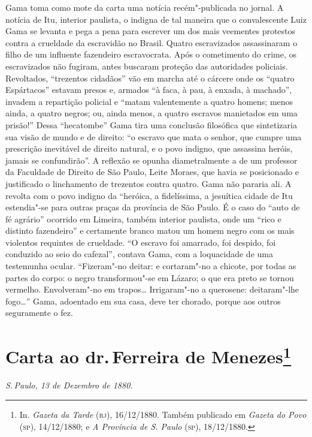 {\small\noindent
Gama toma como mote da carta uma notícia recém"-publicada no
jornal. A notícia de Itu, interior paulista, o indigna de tal
maneira que o convalescente Luiz Gama se levanta e pega a pena para
escrever um dos mais veementes protestos contra a crueldade da
escravidão no Brasil. Quatro escravizados assassinaram o filho de um
influente fazendeiro escravocrata. Após o cometimento do crime, os
escravizados não fugiram, antes buscaram proteção das autoridades
policiais. Revoltados, ``trezentos cidadãos'' vão em marcha até o cárcere
onde os ``quatro Espártacos'' estavam presos e, armados ``à faca, à pau, à
enxada, à machado'', invadem a repartição policial e ``matam valentemente
a quatro homens; menos ainda, a quatro negros; ou, ainda menos, a quatro
escravos manietados em uma prisão!'' Dessa ``hecatombe'' Gama tira uma
conclusão filosófica que sintetizaria sua visão de mundo e de direito:
``o escravo que mata o senhor, que cumpre uma prescrição inevitável de
direito natural, e o povo indigno, que assassina heróis, jamais se
confundirão''. A reflexão se opunha diametralmente a de um professor da
Faculdade de Direito de São Paulo, Leite Moraes, que havia se
posicionado e justificado o linchamento de trezentos contra quatro. Gama
não pararia ali. A revolta com o povo indigno da ``heróica, a
fidelíssima, a jesuítica cidade de Itu estendia"-se para outras praças
da província de São Paulo. É o caso do ``auto de fé agrário'' ocorrido em
Limeira, também interior paulista, onde um ``rico e distinto fazendeiro''
e certamente branco matou um homem negro com os mais violentos requintes de
crueldade. ``O escravo foi amarrado, foi despido, foi conduzido ao
seio do cafezal'', contava Gama, com a loquacidade de uma testemunha
ocular. ``Fizeram"-no deitar: e cortaram"-no a chicote, por todas as partes
do corpo: o negro transformou"-se em Lázaro; o que era preto se tornou
vermelho. Envolveram"-no em trapos\ldots{} Irrigaram"-no a querosene:
deitaram"-lhe fogo\ldots{}'' Gama, adoentado em sua casa, deve ter chorado,
porque aos outros seguramente o fez. }

\chapter{Carta ao dr.\,Ferreira de Menezes\footnote[*]{In.
  \emph{Gazeta da Tarde} (\textsc{rj}), 16/12/1880. Também publicado em
  \emph{Gazeta do Povo} (\textsc{sp}), 14/12/1880; e \emph{A Província de S.
  Paulo} (\textsc{sp}), 18/12/1880.}}

\hfill\emph{S.\,Paulo, 13 de Dezembro de 1880.}\bigskip

